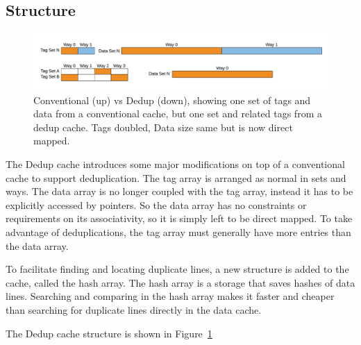 \subsection{Structure}
\label{ssec:DedupStructure}
\begin{figure}
    \includegraphics[width=\textwidth]{Dedup.pdf}
    \caption[Dedup Cache]{Conventional (up) vs Dedup (down), showing one set of tags and data from a conventional cache, but one set and related tags from a dedup cache. Tags doubled, Data size same but is now direct mapped.}
    \label{fig:Dedup}
\end{figure}
The Dedup cache introduces some major modifications on top of a conventional cache to support deduplication. The tag array is arranged as normal in sets and ways. The data array is no longer coupled with the tag array, instead it has to be explicitly accessed by pointers. So the data array has no constraints or requirements on its associativity, so it is simply left to be direct mapped. To take advantage of deduplications, the tag array must generally have more entries than the data array.\par
To facilitate finding and locating duplicate lines, a new structure is added to the cache, called the hash array. The hash array is a storage that saves hashes of data lines. Searching and comparing in the hash array makes it faster and cheaper than searching for duplicate lines directly in the data cache.

The Dedup cache structure is shown in Figure~\ref{fig:Dedup}

